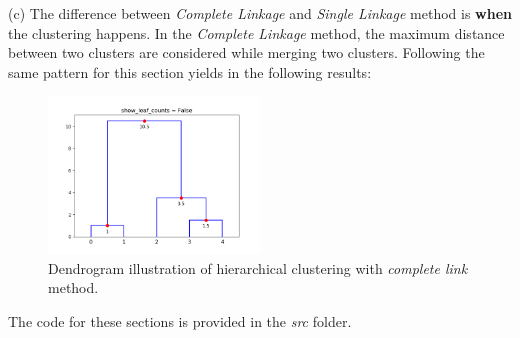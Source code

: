 \documentclass[12pt]{article}
\numberwithin{equation}{section}
\numberwithin{table}{section}
\numberwithin{figure}{section}
\begin{document}
(c) The difference between \textit{Complete Linkage} and \textit{Single Linkage} method is \textbf{when} the clustering happens. In the \textit{Complete Linkage} method, the maximum distance between two clusters are considered while merging two clusters. Following the same pattern for this section yields in the following results:
\begin{figure}[!h]\centering
	\includegraphics[width=0.5\textwidth]{dendro3.PNG}
	\caption{Dendrogram illustration of hierarchical clustering with \textit{complete link} method.}
	\label{pl1}
\end{figure}
The code for these sections is provided in the \textit{src} folder.
\end{document}
